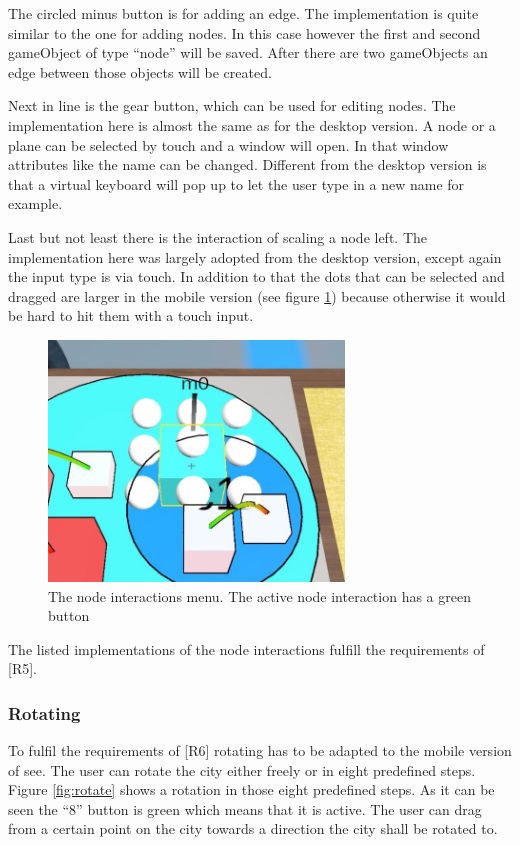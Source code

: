 The circled minus button is for adding an \gls{edge}.
The implementation is quite similar to the one for adding \glspl{node}.
In this case however the first and second \gls{gameObject} of type \enquote{\gls{node}} will be saved.
After there are two \glspl{gameObject} an \gls{edge} between those objects will be created.

Next in line is the gear button, which can be used for editing \glspl{node}.
The implementation here is almost the same as for the desktop version.
A \gls{node} or a \gls{plane} can be selected by touch and a window will open.
In that window attributes like the name can be changed.
Different from the desktop version is that a virtual keyboard will pop up to let the user type in a new name for example.

Last but not least there is the interaction of scaling a node left.
The implementation here was largely adopted from the desktop version, except again the input type is via touch.
In addition to that the dots that can be selected and dragged are larger in the mobile version (see figure \ref{fig:scale}) because otherwise it would be hard to hit them with a touch input.

\begin{figure}[htb]
    \centering
    \includegraphics[width=0.7\textwidth]{Implementation/img/scale.jpeg}
    \caption{The node interactions menu. The active node interaction has a green button}\label{fig:scale}
\end{figure}

The listed implementations of the node interactions fulfill the requirements of [R5].

\subsubsection{Rotating}
To fulfil the requirements of [R6] rotating has to be adapted to the mobile version of \gls{see}.
The user can rotate the city either freely or in eight predefined steps.
Figure \ref{fig:rotate} shows a rotation in those eight predefined steps.
As it can be seen the \enquote{8} button is green which means that it is active.
The user can drag from a certain point on the \gls{city} towards a direction the \gls{city} shall be rotated to.

